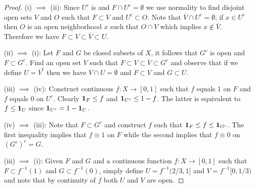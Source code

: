 \begin{proof}
(i) $\implies$ (ii): Since $U^c$ is and $F \cap U^c = \emptyset$ we
use normality to find disjoint open sets $V$ and $O$ such that $F \subset V$
and $U^c \subset O$.  Note that $\overline{V} \cap U^c = \emptyset$; if $x \in U^c$ then $O$ is an open neighborhood $x$ such that
$O \cap V$ which implies $x \notin \overline{V}$. Therefore we have $F
\subset V \subset \overline{V} \subset U$.

(ii) $\implies$ (i): Let $F$ and $G$ be closed subsets of $X$, it
follows that $G^c$ is open and $F \subset G^c$.  Find an open set $V$
such that $F \subset V \subset \overline{V} \subset G^c$ and observe
that if we define $U = \overline{V}^c$ then we have $V \cap U =
\emptyset$ and $F \subset V$ and $G \subset U$.

(iii) $\implies$ (iv): Construct continuous $f : X \to [0,1]$ such
that $f$ equals $1$ on $F$ and $f$ equals 0 on $U^c$.  Clearly
$\textbf{1}_{F} \leq f$ and $\textbf{1}_{U^c} \leq 1 -f$.  The
latter is equivalent to $f \leq \textbf{1}_{U}$ since
$\textbf{1}_{U^c} = 1 - \textbf{1}_{U}$.

(iv) $\implies$ (iii):  Note that $F \subset G^c$ and construct $f$
such that $\textbf{1}_{F} \leq f \leq \textbf{1}_{G^c}$.  The
first inequality implies that $f \equiv 1$ on $F$ while the second
implies that $f \equiv 0$ on $(G^c)^c = G$.

(iii) $\implies$ (i):  Given $F$ and $G$ and a continuous function $f
: X \to [0,1]$ such that $F \subset f^{-1}(1)$ and $G \subset
f^{-1}(0)$, simply define $U =  f^{-1}(2/3,1]$ and $V = f^{-1}[0,1/3)$
and note that by continuity of $f$ both $U$ and $V$ are open.  


\end{proof}
